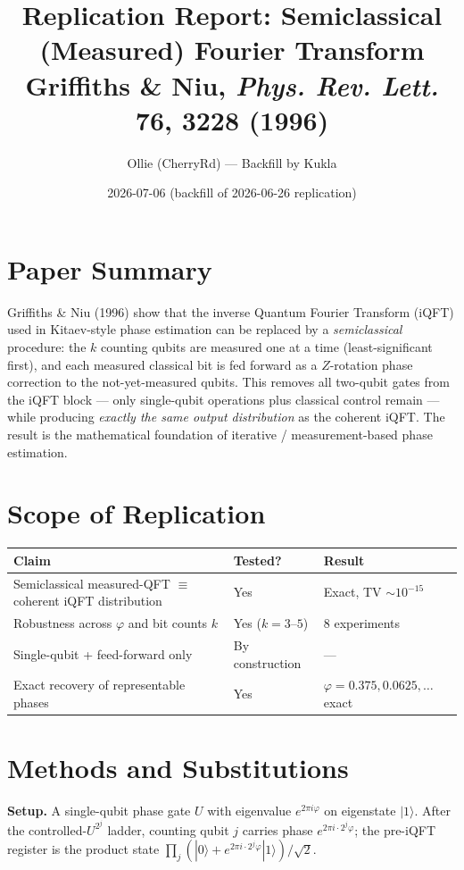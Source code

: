 \documentclass[11pt]{article}
\title{Replication Report: Semiclassical (Measured) Fourier Transform\\
{\large Griffiths \& Niu, \emph{Phys. Rev. Lett.} \textbf{76}, 3228 (1996)}}
\author{Ollie (CherryRd) --- Backfill by Kukla}
\date{2026-07-06 (backfill of 2026-06-26 replication)}
\begin{document}
\maketitle

\section{Paper Summary}
Griffiths \& Niu (1996) show that the inverse Quantum Fourier Transform
(iQFT) used in Kitaev-style phase estimation can be replaced by a
\emph{semiclassical} procedure: the $k$ counting qubits are measured
one at a time (least-significant first), and each measured classical bit
is fed forward as a $Z$-rotation phase correction to the not-yet-measured
qubits. This removes all two-qubit gates from the iQFT block --- only
single-qubit operations plus classical control remain --- while producing
\emph{exactly the same output distribution} as the coherent iQFT. The
result is the mathematical foundation of iterative / measurement-based
phase estimation.

\section{Scope of Replication}
\begin{center}
\begin{tabular}{lll}
\toprule
Claim & Tested? & Result \\
\midrule
Semiclassical measured-QFT $\equiv$ coherent iQFT distribution & Yes & Exact, TV $\sim 10^{-15}$ \\
Robustness across $\varphi$ and bit counts $k$ & Yes ($k{=}3\text{--}5$) & 8 experiments \\
Single-qubit + feed-forward only & By construction & --- \\
Exact recovery of representable phases & Yes & $\varphi=0.375, 0.0625, \dots$ exact \\
\bottomrule
\end{tabular}
\end{center}

\section{Methods and Substitutions}
\textbf{Setup.} A single-qubit phase gate $U$ with eigenvalue $e^{2\pi i \varphi}$
on eigenstate $|1\rangle$. After the controlled-$U^{2^j}$ ladder,
counting qubit $j$ carries phase $e^{2\pi i \cdot 2^j \varphi}$; the
pre-iQFT register is the product state
$\prod_j (|0\rangle + e^{2\pi i \cdot 2^j \varphi}|1\rangle)/\sqrt{2}$.
\end{document}
